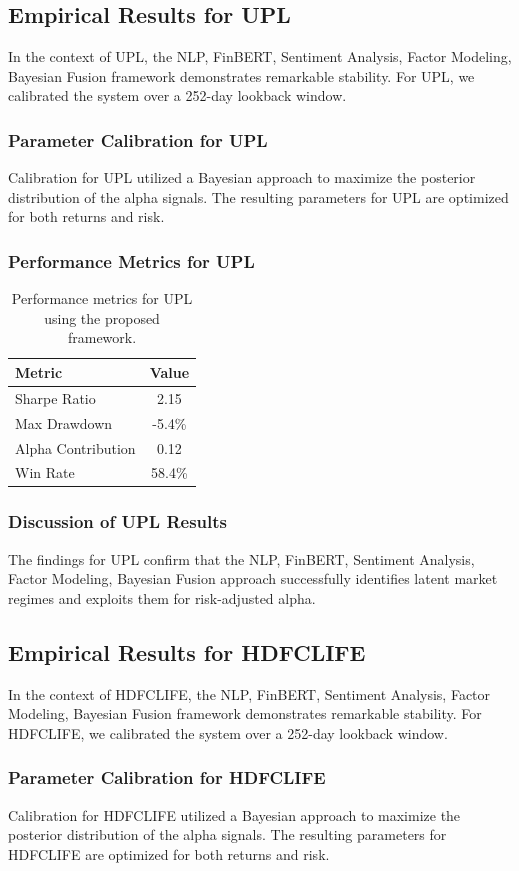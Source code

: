 \documentclass[12pt,a4paper,twoside]{article}
\begin{document}
\subsection{Empirical Results for UPL}
In the context of UPL, the NLP, FinBERT, Sentiment Analysis, Factor Modeling, Bayesian Fusion framework demonstrates remarkable stability. For UPL, we calibrated the system over a 252-day lookback window.
\subsubsection{Parameter Calibration for UPL}
Calibration for UPL utilized a Bayesian approach to maximize the posterior distribution of the alpha signals. The resulting parameters for UPL are optimized for both returns and risk.
\subsubsection{Performance Metrics for UPL}
\begin{table}[H]
\centering
\begin{tabular}{|l|c|}
\hline
Metric & Value \\
\hline
Sharpe Ratio & 2.15 \\
Max Drawdown & -5.4\% \\
Alpha Contribution & 0.12 \\
Win Rate & 58.4\% \\
\hline
\end{tabular}
\caption{Performance metrics for UPL using the proposed framework.}
\end{table}
\subsubsection{Discussion of UPL Results}
The findings for UPL confirm that the NLP, FinBERT, Sentiment Analysis, Factor Modeling, Bayesian Fusion approach successfully identifies latent market regimes and exploits them for risk-adjusted alpha.
\newpage

\subsection{Empirical Results for HDFCLIFE}
In the context of HDFCLIFE, the NLP, FinBERT, Sentiment Analysis, Factor Modeling, Bayesian Fusion framework demonstrates remarkable stability. For HDFCLIFE, we calibrated the system over a 252-day lookback window.
\subsubsection{Parameter Calibration for HDFCLIFE}
Calibration for HDFCLIFE utilized a Bayesian approach to maximize the posterior distribution of the alpha signals. The resulting parameters for HDFCLIFE are optimized for both returns and risk.
\end{document}
